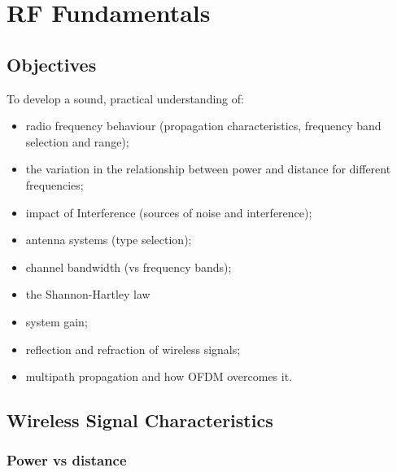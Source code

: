 \chapter{RF Fundamentals}\label{fundamentals}

\minitoc 

\clearpage
\section*{Objectives}
To develop a sound, practical understanding of:
\begin{itemize}

\item radio frequency behaviour (propagation characteristics, frequency band selection and range);

\item the variation in the relationship between power and distance for different frequencies;

\item impact of Interference (sources of noise and interference);

\item antenna systems (type selection);

\item channel bandwidth (vs frequency bands);

\item the Shannon-Hartley law
 
\item system gain; 

\item reflection and refraction of wireless signals;

\item multipath propagation and how OFDM overcomes it.

\end{itemize}


\section{Wireless Signal Characteristics}

\subsection{Power vs distance}


